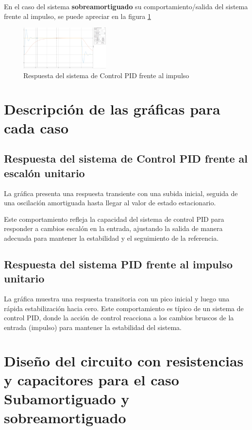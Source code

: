 \documentclass[conference]{IEEEtran}
\begin{document}
	En el caso del sistema \textbf{sobreamortiguado} su comportamiento/salida del sistema frente al impulso, se puede apreciar en la figura \ref{fig:res-sobreamortguado-impulso}
	
	
	\begin{figure}[h]
		\centering
		\includegraphics[width=0.4\textwidth]{media1/res-sobreamortguado-impulso}
		\caption{Respuesta del sistema de Control PID frente al impulso}
		\label{fig:res-sobreamortguado-impulso}
	\end{figure}
	
	
	\section{Descripción de las gráficas para cada caso}
	
	\subsection{Respuesta del sistema de Control PID frente al escalón unitario}
	La gráfica presenta una respuesta transiente con una subida inicial, seguida de una oscilación amortiguada hasta llegar al valor de estado estacionario.
	
	Este comportamiento refleja la capacidad del sistema de control PID para responder a cambios escalón en la entrada, ajustando la salida de manera adecuada para mantener la estabilidad y el seguimiento de la referencia.
	
	\subsection{Respuesta del sistema PID frente al impulso unitario}
	
	La gráfica muestra una respuesta transitoria con un pico inicial y luego una rápida estabilización hacia cero.
	Este comportamiento es típico de un sistema de control PID, donde la acción de control reacciona a los cambios bruscos de la entrada (impulso) para mantener la estabilidad del sistema.
	
	\section{Diseño del circuito con resistencias y capacitores para el caso Subamortiguado y sobreamortiguado}
	
\end{document}
